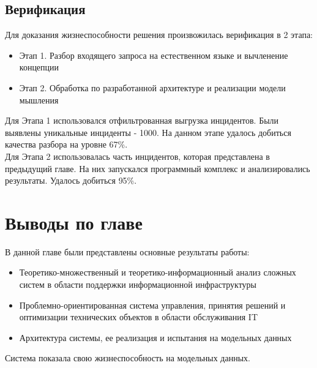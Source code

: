 \subsection{Верификация}
Для доказания жизнеспособности решения произвожилась верификация в 2 этапа:
\begin{itemize}
	\item Этап 1. Разбор входящего запроса на естественном языке и вычленение концепции
	\item Этап 2. Обработка по разработанной архитектуре и реализации модели мышления  
\end{itemize}
Для Этапа 1 использовался отфильтрованная выгрузка инцидентов. Были выявлены уникальные инциденты - 1000. На данном этапе удалось добиться качества разбора на уровне 67\%. \\
Для Этапа 2 использовалась часть инцидентов, которая представлена в предыдущий главе. На них запускался программный комплекс и анализировались результаты. Удалось добиться 95\%. \\
\section{Выводы по главе}
В данной главе были представлены основные результаты работы:
\begin{itemize}
	\item Теоретико-множественный и теоретико-информационный анализ сложных систем в области поддержки информационной инфраструктуры
	\item Проблемно-ориентированная система управления, принятия решений и оптимизации технических объектов в области обслуживания IT
	\item Архитектура системы, ее реализация и испытания на модельных данных
\end{itemize}
Система показала свою жизнеспособность на модельных данных. 


\clearpage